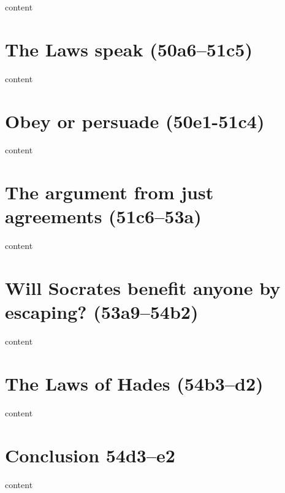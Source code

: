 \documentclass[11pt]{article}
\begin{document}
content

\section{The Laws speak (50a6--51c5)}

content

\section{Obey or persuade (50e1-51c4)}

content

\section{The argument from just agreements (51c6--53a)}

content

\section{Will Socrates benefit anyone by escaping? (53a9--54b2)}

content

\section{The Laws of Hades (54b3--d2)}

content

\section{Conclusion 54d3--e2}

content

\newpage


\end{document}
